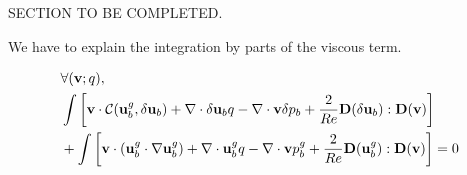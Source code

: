 \documentclass[twocolumn,10pt]{asme2ej}
\begin{document}
SECTION TO BE COMPLETED.

We have to explain the integration by parts of the viscous term.




\begin{eqnarray}
\label{NewtonWeak}
&\forall ({\bf v};q), \\
\displaystyle &\int \left[ {\bf v} \cdot {\cal C}( {\bf u}_b^g , \delta {\bf u}_b) +  \nabla  \cdot \delta {\bf u}_b q -\nabla  \cdot {\bf v} \delta p_b
+ \frac{2}{Re} {\bf D}(\delta {\bf u}_b) : {\bf D}({\bf v}) \right]
\nonumber
\\
\nonumber
\displaystyle & + \int \left[ {\bf v} \cdot ( {\bf u}_b^g \cdot \nabla {\bf u}_b^g) 
+ \nabla \cdot {\bf u}_b^g  q 
- \nabla \cdot {\bf v} p_b^g
+ \frac{2}{Re} {\bf D}({\bf u}_b^g) : {\bf D}({\bf v}) \right] = 0 
\end{eqnarray}





\end{document}
